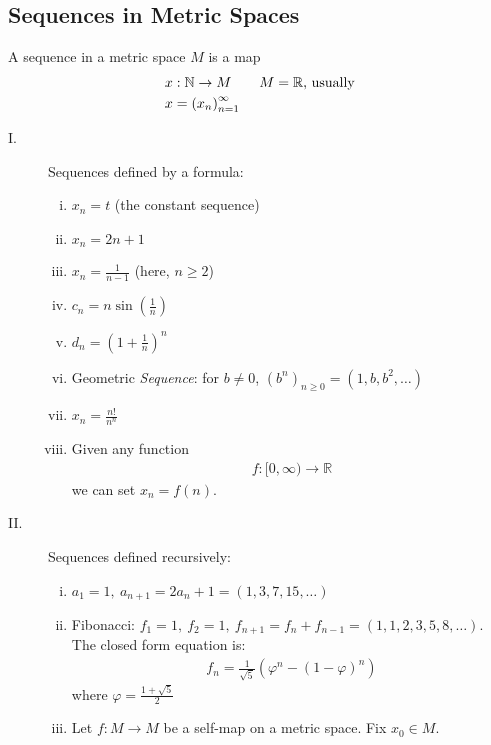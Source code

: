 \documentclass[10pt]{extarticle}
\newcommand{\N}{\mathbb{N}}
\newcommand{\R}{\mathbb{R}}
\begin{document}
  \subsection{Sequences in Metric Spaces}%
    A sequence in a metric space $M$ is a map
    \begin{align*}
      x&: \N \rightarrow M \tag*{$M = \R$, usually}\\
      x &= \left(x_n\right)_{n=1}^{\infty}
    \end{align*}
    \begin{description}
      \item[I.] Sequences defined by a formula:
        \begin{enumerate}[(i)]
          \item $x_n = t$ (the constant sequence)
          \item $x_n = 2n + 1$
          \item $x_n = \frac{1}{n-1}$ (here, $n \geq 2$)
          \item $c_n = n\sin\left(\frac{1}{n}\right)$
          \item $d_n = \left(1 + \frac{1}{n}\right)^n$
          \item Geometric \textsl{Sequence}: for $b\neq 0$, $(b^n)_{n\geq 0} = (1,b,b^2,\dots)$
          \item $x_n = \frac{n!}{n^n}$
          \item Given any function
            \begin{align*}
              f:[0,\infty)\rightarrow\R
            \end{align*}
            we can set $x_n = f(n)$.
        \end{enumerate}
      \item[II.] Sequences defined recursively:
        \begin{enumerate}[(i)]
          \item $a_1 = 1,~a_{n+1}=2a_n + 1 = (1,3,7,15,\dots)$
          \item Fibonacci: $f_1 = 1,~f_2 = 1,~f_{n+1} = f_{n} + f_{n-1} = (1,1,2,3,5,8,\dots)$. The closed form equation is:
            \begin{align*}
              f_n = \frac{1}{\sqrt{5}}\left(\varphi^n - (1-\varphi)^n\right)
            \end{align*}
            where $\varphi = \frac{1 + \sqrt{5}}{2}$
          \item Let $f: M\rightarrow M$ be a self-map on a metric space. Fix $x_0\in M$.\\


\end{enumerate}
\end{description}
\end{document}
